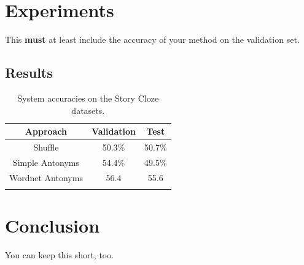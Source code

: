 \documentclass{article}
\begin{document}
\section{Experiments}
This {\bf must} at least include the accuracy of your method on the validation set.

\subsection{Results}
\begin{table}[h]
  \centering
  \begin{tabular}{ c c c}
    \toprule
    Approach & Validation & Test \\
    \midrule
    Shuffle & 50.3\% & 50.7\%\\
    Simple Antonyms & 54.4\% & 49.5\%\\
    Wordnet Antonyms & 56.4 & 55.6\\

    \bottomrule
    \\
  \end{tabular}
  \label{Tab:results}
  \caption{System accuracies on the Story Cloze datasets. }
\end{table}

\section{Conclusion}
You can keep this short, too.





\end{document}
